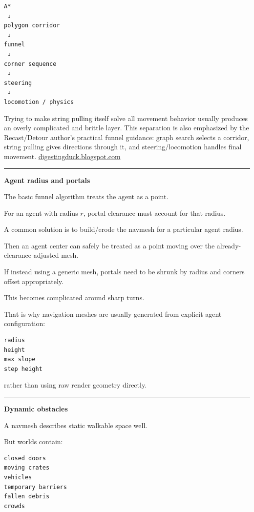 \begin{verbatim}
A*
 ↓
polygon corridor
 ↓
funnel
 ↓
corner sequence
 ↓
steering
 ↓
locomotion / physics
\end{verbatim}

Trying to make string pulling itself solve all movement behavior usually produces an overly complicated and brittle layer. This separation is also emphasized by the Recast/Detour author's practical funnel guidance: graph search selects a corridor, string pulling gives directions through it, and steering/locomotion handles final movement. \href{https://digestingduck.blogspot.com/2010/03/simple-stupid-funnel-algorithm.html?utm_source=chatgpt.com}{digestingduck.blogspot.com}

\begin{center}\rule{0.5\linewidth}{0.5pt}\end{center}

\textbf{Agent radius and portals}

The basic funnel algorithm treats the agent as a point.

For an agent with radius \(r\), portal clearance must account for that radius.

A common solution is to build/erode the navmesh for a particular agent radius.

Then an agent center can safely be treated as a point moving over the already-clearance-adjusted mesh.

If instead using a generic mesh, portals need to be shrunk by radius and corners offset appropriately.

This becomes complicated around sharp turns.

That is why navigation meshes are usually generated from explicit agent configuration:

\begin{verbatim}
radius
height
max slope
step height
\end{verbatim}

rather than using raw render geometry directly.

\begin{center}\rule{0.5\linewidth}{0.5pt}\end{center}

\textbf{Dynamic obstacles}

A navmesh describes static walkable space well.

But worlds contain:

\begin{verbatim}
closed doors
moving crates
vehicles
temporary barriers
fallen debris
crowds
\end{verbatim}

